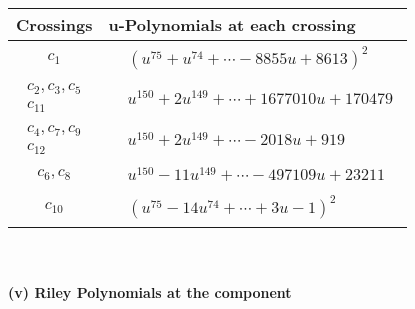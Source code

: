 \documentclass[1p]{elsarticle_modified}
\theoremstyle{definition}
\begin{document}
\begin{tabular}{m{50pt}|m{274pt}}
Crossings & \hspace{64pt}u-Polynomials at each crossing \\
\hline $$\begin{aligned}c_{1}\end{aligned}$$&$\begin{aligned}
&(u^{75}+u^{74}+\cdots-8855 u+8613)^{2}
\end{aligned}$\\
\hline $$\begin{aligned}c_{2},c_{3},c_{5}\\c_{11}\end{aligned}$$&$\begin{aligned}
&u^{150}+2 u^{149}+\cdots+1677010 u+170479
\end{aligned}$\\
\hline $$\begin{aligned}c_{4},c_{7},c_{9}\\c_{12}\end{aligned}$$&$\begin{aligned}
&u^{150}+2 u^{149}+\cdots-2018 u+919
\end{aligned}$\\
\hline $$\begin{aligned}c_{6},c_{8}\end{aligned}$$&$\begin{aligned}
&u^{150}-11 u^{149}+\cdots-497109 u+23211
\end{aligned}$\\
\hline $$\begin{aligned}c_{10}\end{aligned}$$&$\begin{aligned}
&(u^{75}-14 u^{74}+\cdots+3 u-1)^{2}
\end{aligned}$\\
\hline
\end{tabular}\\~\\
\newpage\renewcommand{\arraystretch}{1}
\flushleft \textbf{(v) Riley Polynomials at the component}\newline \\
\end{document}
